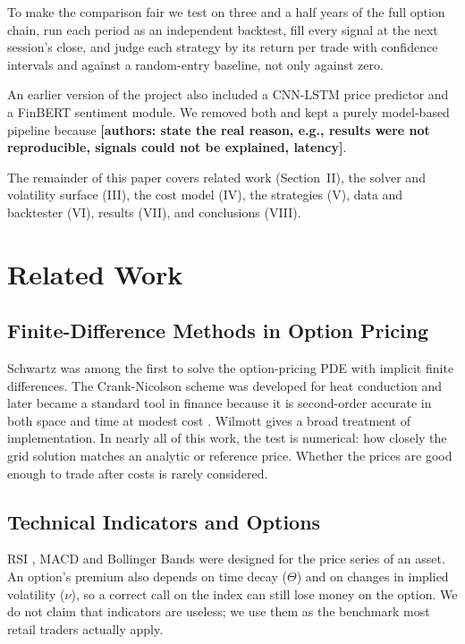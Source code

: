 \documentclass[10pt,journal,compsoc]{IEEEtran}
\newcommand{\fillin}[1]{\textbf{[#1]}}
\begin{document}
To make the comparison fair we test on three and a half years of the full option chain, run each period as an independent backtest, fill every signal at the next session's close, and judge each strategy by its return per trade with confidence intervals and against a random-entry baseline, not only against zero.

An earlier version of the project also included a CNN-LSTM price predictor and a FinBERT sentiment module. We removed both and kept a purely model-based pipeline because \fillin{authors: state the real reason, e.g., results were not reproducible, signals could not be explained, latency}.

The remainder of this paper covers related work (Section~II), the solver and volatility surface (III), the cost model (IV), the strategies (V), data and backtester (VI), results (VII), and conclusions (VIII).

\section{Related Work}

\subsection{Finite-Difference Methods in Option Pricing}
Schwartz \cite{schwartz1977valuation} was among the first to solve the option-pricing PDE with implicit finite differences. The Crank-Nicolson scheme was developed for heat conduction \cite{crank1947practical} and later became a standard tool in finance because it is second-order accurate in both space and time at modest cost \cite{duffy2006finite}. Wilmott \cite{wilmott2006paul} gives a broad treatment of implementation. In nearly all of this work, the test is numerical: how closely the grid solution matches an analytic or reference price. Whether the prices are good enough to trade after costs is rarely considered.

\subsection{Technical Indicators and Options}
RSI \cite{wilder1978new}, MACD \cite{appel2005technical} and Bollinger Bands \cite{bollinger2001bollinger} were designed for the price series of an asset. An option's premium also depends on time decay ($\Theta$) and on changes in implied volatility ($\nu$), so a correct call on the index can still lose money on the option. We do not claim that indicators are useless; we use them as the benchmark most retail traders actually apply.
\end{document}

